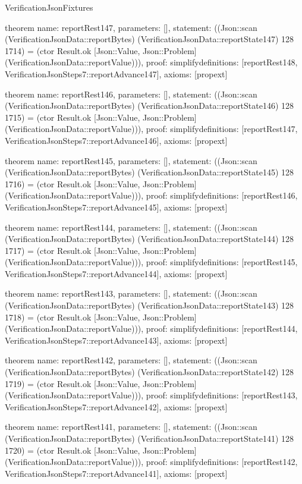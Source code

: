\begin{lexlean}{VerificationJsonFixtures}
\begin{semanticmodule}
theorem{
  name: reportRest147,
  parameters: [],
  statement: ((Json::scan (VerificationJsonData::reportBytes) (VerificationJsonData::reportState147) 128 1714) = (ctor Result.ok [Json::Value, Json::Problem] (VerificationJsonData::reportValue))),
  proof: simplify{definitions: [reportRest148, VerificationJsonSteps7::reportAdvance147]},
  axioms: [propext]
}

theorem{
  name: reportRest146,
  parameters: [],
  statement: ((Json::scan (VerificationJsonData::reportBytes) (VerificationJsonData::reportState146) 128 1715) = (ctor Result.ok [Json::Value, Json::Problem] (VerificationJsonData::reportValue))),
  proof: simplify{definitions: [reportRest147, VerificationJsonSteps7::reportAdvance146]},
  axioms: [propext]
}

theorem{
  name: reportRest145,
  parameters: [],
  statement: ((Json::scan (VerificationJsonData::reportBytes) (VerificationJsonData::reportState145) 128 1716) = (ctor Result.ok [Json::Value, Json::Problem] (VerificationJsonData::reportValue))),
  proof: simplify{definitions: [reportRest146, VerificationJsonSteps7::reportAdvance145]},
  axioms: [propext]
}

theorem{
  name: reportRest144,
  parameters: [],
  statement: ((Json::scan (VerificationJsonData::reportBytes) (VerificationJsonData::reportState144) 128 1717) = (ctor Result.ok [Json::Value, Json::Problem] (VerificationJsonData::reportValue))),
  proof: simplify{definitions: [reportRest145, VerificationJsonSteps7::reportAdvance144]},
  axioms: [propext]
}

theorem{
  name: reportRest143,
  parameters: [],
  statement: ((Json::scan (VerificationJsonData::reportBytes) (VerificationJsonData::reportState143) 128 1718) = (ctor Result.ok [Json::Value, Json::Problem] (VerificationJsonData::reportValue))),
  proof: simplify{definitions: [reportRest144, VerificationJsonSteps7::reportAdvance143]},
  axioms: [propext]
}

theorem{
  name: reportRest142,
  parameters: [],
  statement: ((Json::scan (VerificationJsonData::reportBytes) (VerificationJsonData::reportState142) 128 1719) = (ctor Result.ok [Json::Value, Json::Problem] (VerificationJsonData::reportValue))),
  proof: simplify{definitions: [reportRest143, VerificationJsonSteps7::reportAdvance142]},
  axioms: [propext]
}

theorem{
  name: reportRest141,
  parameters: [],
  statement: ((Json::scan (VerificationJsonData::reportBytes) (VerificationJsonData::reportState141) 128 1720) = (ctor Result.ok [Json::Value, Json::Problem] (VerificationJsonData::reportValue))),
  proof: simplify{definitions: [reportRest142, VerificationJsonSteps7::reportAdvance141]},
  axioms: [propext]
}


\end{semanticmodule}
\end{lexlean}

